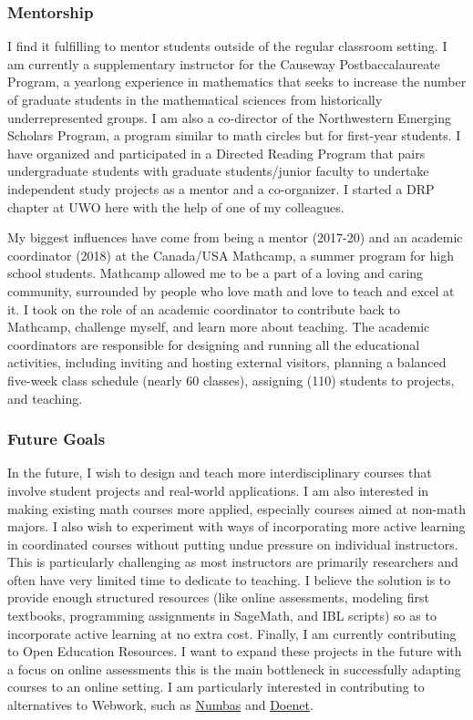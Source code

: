 \documentclass[
]{report}
\begin{document}
\hypertarget{mentorship}{%
\subsubsection*{Mentorship}\label{mentorship}}


I find it fulfilling to mentor students outside of the regular classroom setting.
I am currently a supplementary instructor for the Causeway Postbaccalaureate Program, a yearlong experience in mathematics that seeks to increase the number of graduate students in the mathematical sciences from historically underrepresented groups.
I am also a co-director of the Northwestern Emerging Scholars Program, a program similar to math circles but for first-year students.
I have organized and participated in a Directed Reading Program that pairs undergraduate students with graduate students/junior faculty to undertake independent study projects as a mentor and a co-organizer.
I started a DRP chapter at UWO here with the help of one of my colleagues.

My biggest influences have come from being a mentor (2017-20) and an academic coordinator (2018) at the Canada/USA Mathcamp, a summer program for high school students. Mathcamp allowed me to be a part of a loving and caring community, surrounded by people who love math and love to teach and excel at it. I took on the role of an academic coordinator to contribute back to Mathcamp, challenge myself, and learn more about teaching. The academic coordinators are responsible for designing and running all the educational activities, including inviting and hosting external visitors, planning a balanced five-week class schedule (nearly 60 classes), assigning (110) students to projects, and teaching.

\hypertarget{future-goals}{%
\subsubsection*{Future Goals}\label{future-goals}}


In the future, I wish to design and teach more interdisciplinary courses that involve student projects and real-world applications.
I am also interested in making existing math courses more applied, especially courses aimed at non-math majors.
I also wish to experiment with ways of incorporating more active learning in coordinated courses without putting undue pressure on individual instructors.
This is particularly challenging as most instructors are primarily researchers and often have very limited time to dedicate to teaching.
I believe the solution is to provide enough structured resources (like online assessments, modeling first textbooks, programming assignments in SageMath, and IBL scripts) so as to incorporate active learning at no extra cost.
Finally, I am currently contributing to Open Education Resources. I want to expand these projects in the future with a focus on online assessments this is the main bottleneck in successfully adapting courses to an online setting. I am particularly interested in contributing to alternatives to Webwork, such as \href{https://numbas.mathcentre.ac.uk/}{Numbas} and \href{https://www.doenet.org/}{Doenet}.
\end{document}
